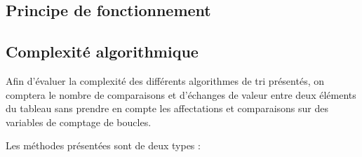 \documentclass[11pt,a4paper]{article}
\begin{document}
\subsection{Principe de fonctionnement}


\newpage
\subsection{Complexité algorithmique}
Afin d’évaluer la complexité des différents algorithmes de tri présentés,
on comptera le nombre de comparaisons et d’échanges de valeur entre deux
éléments du tableau sans prendre en compte les affectations et comparaisons
sur des variables de comptage de boucles.\\
\vspace{0.1cm}

Les méthodes présentées sont de deux types :
\end{document}
